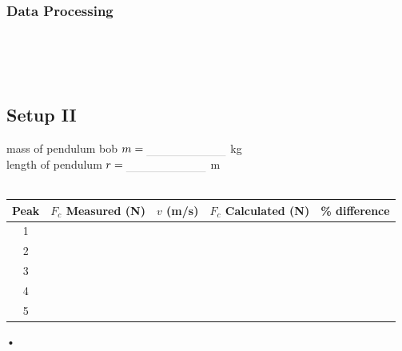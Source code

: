 \documentclass[main.tex]{subfiles}
\begin{document}
\newpage
\subsubsection*{Data Processing}
\begin{doublespace}
\\[8pt]
\\[8pt]
\\[8pt]
\end{doublespace}

\newpage
\subsection*{Setup II}
\begin{doublespace}
mass of pendulum bob $m=\rule[-1mm]{2.5cm}{.1pt}$ kg\\
length of pendulum $r=\rule[-1mm]{2.5cm}{.1pt}$ m\\ \\
\begin{tabular}{|c|c|c|c|c|}
\hline
Peak & $F_c$ Measured (N) & $v$ (m/s) & $F_c$ Calculated (N) & \% difference\\
\hline
1 &&&&\\
\hline
2 &&&&\\
\hline
3 &&&&\\
\hline
4 &&&&\\
\hline
5 &&&&\\
\hline
\end{tabular}•
\end{doublespace}
\end{document}
